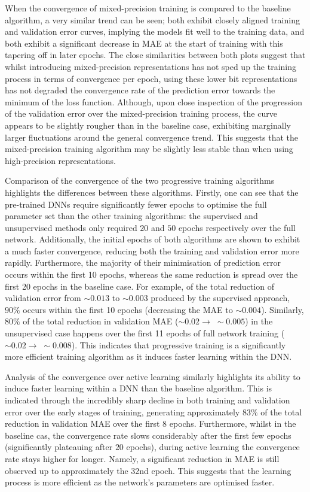 \documentclass[a4paper, 11pt]{report}
\begin{document}
    When the convergence of mixed-precision training is compared to the baseline algorithm, a very similar trend can be seen; both exhibit closely aligned training and validation error curves, implying the models fit well to the training data, and both exhibit a significant decrease in MAE at the start of training with this tapering off in later epochs. The close similarities between both plots suggest that whilst introducing mixed-precision representations has not sped up the training process in terms of convergence per epoch, using these lower bit representations has not degraded the convergence rate of the prediction error towards the minimum of the loss function. Although, upon close inspection of the progression of the validation error over the mixed-precision training process, the curve appears to be slightly rougher than in the baseline case, exhibiting marginally larger fluctuations around the general convergence trend. This suggests that the mixed-precision training algorithm may be slightly less stable than when using high-precision representations.

    Comparison of the convergence of the two progressive training algorithms highlights the differences between these algorithms. Firstly, one can see that the pre-trained DNNs require significantly fewer epochs to optimise the full parameter set than the other training algorithms: the supervised and unsupervised methods only required $20$ and $50$ epochs respectively over the full network. Additionally, the initial epochs of both algorithms are shown to exhibit a much faster convergence, reducing both the training and validation error more rapidly. Furthermore, the majority of their minimisation of prediction error occurs within the first 10 epochs, whereas the same reduction is spread over the first 20 epochs in the baseline case. For example, of the total reduction of validation error from $\sim \! 0.013$ to $\sim \! 0.003$ produced by the supervised approach, $90\%$ occurs within the first 10 epochs (decreasing the MAE to $\sim \! 0.004$). Similarly, $80\%$ of the total reduction in validation MAE ($\sim \! 0.02 \to \; \sim \! 0.005$) in the unsupervised case happens over the first 11 epochs of full network training ($\sim \! 0.02 \to \; \sim \! 0.008$). This indicates that progressive training is a significantly more efficient training algorithm as it induces faster learning within the DNN.

    Analysis of the convergence over active learning similarly highlights its ability to induce faster learning within a DNN than the baseline algorithm. This is indicated through the incredibly sharp decline in both training and validation error over the early stages of training, generating approximately $83\%$ of the total reduction in validation MAE over the first $8$ epochs. Furthermore, whilst in the baseline cas, the convergence rate slows considerably after the first few epochs (significantly plateauing after $20$ epochs), during active learning the convergence rate stays higher for longer. Namely, a significant reduction in MAE is still observed up to approximately the 32nd epoch. This suggests that the learning process is more efficient as the network's parameters are optimised faster.
\end{document}
